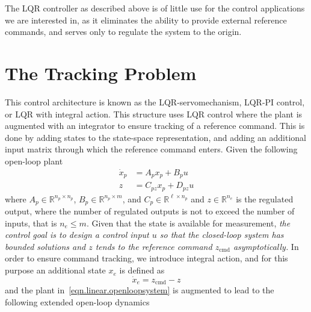 The LQR controller as described above is of little use for the control applications we are interested in, as it eliminates the ability to provide external reference commands, and serves only to regulate the system to the origin.

\section{The Tracking Problem}

This control architecture is known as the LQR-servomechanism, LQR-PI control, or LQR with integral action.
This structure uses LQR control where the plant is augmented with an integrator to ensure tracking of a reference command.
This is done by adding states to the state-space representation, and adding an additional input matrix through which the reference command enters.
Given the following open-loop plant
\begin{equation}
  \label{eqn.linear.openloopsystem}
  \begin{split}
    \dot{x}_{p}&=A_{p}x_{p}+B_{p}u \\
    z&=C_{pz}x_{p}+D_{pz}u
  \end{split}
\end{equation}
where $A_{p}\in\mathbb{R}^{n_{p}\times n_{p}}$, $B_{p}\in\mathbb{R}^{n_{p}\times m}$, and $C_{p}\in\mathbb{R}^{\ell\times n_{p}}$ and $z\in\mathbb{R}^{n_{e}}$ is the regulated output, where the number of regulated outputs is not to exceed the number of inputs, that is $n_{e}\leq m$.
Given that the state is available for measurement, \emph{the control goal is to design a control input $u$ so that the closed-loop system has bounded solutions and $z$ tends to the reference command $z_{\text{cmd}}$ asymptotically.}
In order to ensure command tracking, we introduce integral action, and for this purpose an additional state $x_e$ is defined as
\begin{equation*}
  \dot{x}_{e}=z_{\text{cmd}}-z
\end{equation*}
and the plant in~\eqref{eqn.linear.openloopsystem} is augmented to lead to the following extended open-loop dynamics
